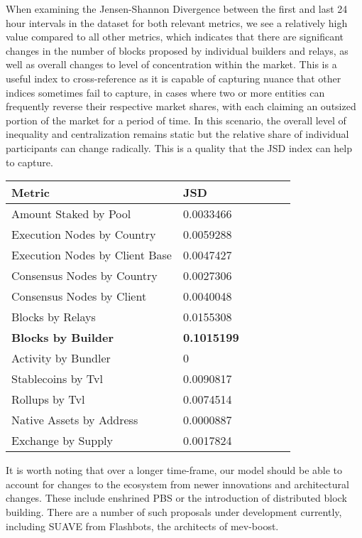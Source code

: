 \documentclass[conference]{IEEEtran}
\begin{document}
When examining the Jensen-Shannon Divergence between the first and last 24 hour intervals in the dataset for both relevant metrics, we see a relatively high value compared to all other metrics, which indicates that there are significant changes in the number of blocks proposed by individual builders and relays, as well as overall changes to level of concentration within the market.  This is a useful index to cross-reference as it is capable of capturing nuance that other indices sometimes fail to capture, in cases where two or more entities can frequently reverse their respective market shares, with each claiming an outsized portion of the market for a period of time.  In this scenario, the overall level of inequality and centralization remains static but the relative share of individual participants can change radically.  This is a quality that the JSD index can help to capture.

\vspace{8pt}

\begin{center}
\begin{tabular*}{\linewidth}{@{\extracolsep{\fill}} llllll }
\hline
\textbf{Metric} & \textbf{JSD} \\ \hline
Amount Staked by Pool & 0.0033466 \\
Execution Nodes by Country & 0.0059288 \\
Execution Nodes by Client Base & 0.0047427 \\
Consensus Nodes by Country & 0.0027306 \\
Consensus Nodes by Client & 0.0040048 \\
Blocks by Relays & 0.0155308 \\
\textbf{Blocks by Builder} & \textbf{0.1015199} \\ \hline
Activity by Bundler & 0 \\
Stablecoins by Tvl & 0.0090817 \\
Rollups by Tvl & 0.0074514 \\
Native Assets by Address & 0.0000887 \\
Exchange by Supply & 0.0017824 \\ \hline
\end{tabular*}
\end{center}

\vspace{8pt}

It is worth noting that over a longer time-frame, our model should be able to account for changes to the ecosystem from newer innovations and architectural changes.  These include enshrined PBS or the introduction of distributed block building.  There are a number of such proposals under development currently, including SUAVE from Flashbots, the architects of mev-boost.
\end{document}
